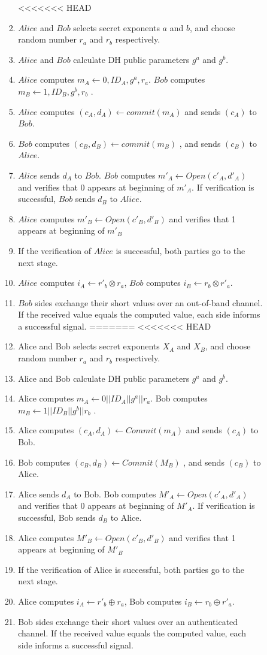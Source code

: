 \begin{enumerate}
\begin{enumerate}
\begin{enumerate}
\begin{enumerate}
<<<<<<< HEAD
\item $Alice$ and $Bob$ selects secret exponents $a$ and $b$, and choose random number $r_a$ and $r_b$ respectively. 
\item $Alice$ and $Bob$ calculate DH public parameters $g^a$ and $g^b$. 
\item $Alice$ computes $m_A \leftarrow 0,ID_A,g^a,r_a$. $Bob$ computes $m_B \leftarrow 1,ID_B,g^b,r_b$ .
\item $Alice$ computes $(c_A,d_A) \leftarrow commit(m_A)$ and sends $(c_A)$ to $Bob$.
\item $Bob$ computes $(c_B,d_B) \leftarrow commit(m_B)$ , and sends $(c_B)$ to $Alice$.
\item $Alice$ sends $d_A$ to $Bob$. $Bob$ computes $m'_A \leftarrow Open(c'_A,d'_A)$ and verifies that 0 appears at beginning of $m'_A$. If verification is successful, $Bob$ sends $d_B$ to $Alice$.
\item $Alice$ computes $m'_B \leftarrow Open(c'_B,d'_B)$ and verifies that 1 appears at beginning of $m'_B$
 \item If the verification of $Alice$ is successful, both parties go to the next stage.
\item $Alice$ computes $i_A \leftarrow r'_b \otimes r_a$, $Bob$ computes $i_B \leftarrow r_b \otimes r'_a$.
\item $Bob$ sides exchange their short values over an out-of-band channel. If the received value equals the computed value, each side informs a successful signal. 
=======
<<<<<<< HEAD
\item Alice and Bob selects secret exponents $X_A$ and $X_B$, and choose random number $r_a$ and $r_b$ respectively. 
\item Alice and Bob calculate DH public parameters $g^a$ and $g^b$. 
\item Alice computes $m_A \leftarrow 0||ID_A||g^a||r_a$. Bob computes $m_B \leftarrow 1||ID_B||g^b||r_b$ .
\item Alice computes $(c_A,d_A) \leftarrow Commit(m_A)$ and sends $(c_A)$ to Bob.
\item Bob computes $(c_B,d_B) \leftarrow Commit(M_B)$ , and sends $(c_B)$ to Alice.
\item Alice sends $d_A$ to Bob. Bob computes $M'_A \leftarrow Open(c'_A,d'_A)$ and verifies that 0 appears at beginning of $M'_A$. If verification is successful, Bob sends $d_B$ to Alice.
\item Alice computes $M'_B \leftarrow Open(c'_B,d'_B)$ and verifies that 1 appears at beginning of $M'_B$
 \item If the verification of Alice is successful, both parties go to the next stage.
\item Alice computes $i_A \leftarrow r'_b \oplus r_a$, Bob computes $i_B \leftarrow r_b \oplus r'_a$.
\item Bob sides exchange their short values over an authenticated channel. If the received value equals the computed value, each side informs a successful signal. 
\end{enumerate}


\end{enumerate}
\end{enumerate}
\end{enumerate}
